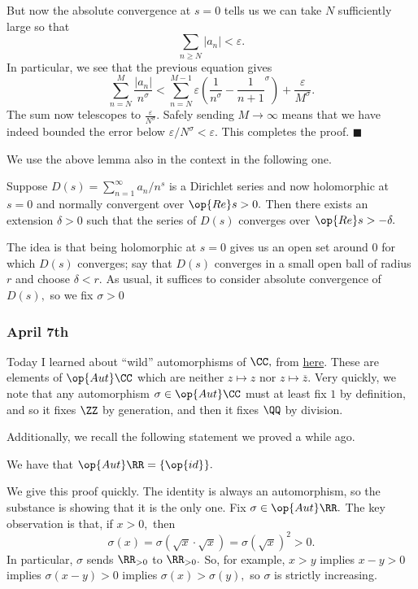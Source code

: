 But now the absolute convergence at $s=0$ tells us we can take $N$ sufficiently large so that
\[\sum_{n\ge N}|a_n|<\varepsilon.\]
In particular, we see that the previous equation gives
\[\sum_{n=N}^M\frac{|a_n|}{n^\sigma}<\sum_{n=N}^{M-1}\varepsilon\left(\frac1{n^\sigma}-\frac1{n+1}^\sigma\right)+\frac\varepsilon{M^\sigma}.\]
The sum now telescopes to $\frac{\varepsilon}{N^\sigma}.$ Safely sending $M\to\infty$ means that we have indeed bounded the error below $\varepsilon/N^\sigma<\varepsilon.$ This completes the proof. $\blacksquare$

We use the above lemma also in the context in the following one.
\begin{lemma}
    Suppose $D(s)=\sum_{n=1}^\infty a_n/n^s$ is a Dirichlet series and now holomorphic at $s=0$ and normally convergent over $\op{Re}s>0.$ Then there exists an extension $\delta>0$ such that the series of $D(s)$ converges over $\op{Re}s>-\delta.$
\end{lemma}
The idea is that being holomorphic at $s=0$ gives us an open set around $0$ for which $D(s)$ converges; say that $D(s)$ converges in a small open ball of radius $r$ and choose $\delta<r.$ As usual, it suffices to consider absolute convergence of $D(s),$ so we fix $\sigma>0$

\todo{}

\subsubsection{April 7th}
Today I learned about ``wild'' automorphisms of $\CC,$ from \href{https://web.archive.org/web/20190611111804/https://www.jstor.org/stable/2689301}{here}. These are elements of $\op{Aut}\CC$ which are neither $z\mapsto z$ nor $z\mapsto\overline z.$ Very quickly, we note that any automorphism $\sigma\in\op{Aut}\CC$ must at least fix $1$ by definition, and so it fixes $\ZZ$ by generation, and then it fixes $\QQ$ by division.

Additionally, we recall the following statement we proved a while ago.
\begin{lemma}
    We have that $\op{Aut}\RR=\{\op{id}\}.$
\end{lemma}
We give this proof quickly. The identity is always an automorphism, so the substance is showing that it is the only one. Fix $\sigma\in\op{Aut}\RR.$ The key observation is that, if $x>0,$ then
\[\sigma(x)=\sigma(\sqrt x\cdot\sqrt x)=\sigma(\sqrt x)^2>0.\]
In particular, $\sigma$ sends $\RR_{>0}$ to $\RR_{>0}.$ So, for example, $x>y$ implies $x-y>0$ implies $\sigma(x-y)>0$ implies $\sigma(x)>\sigma(y),$ so $\sigma$ is strictly increasing.

